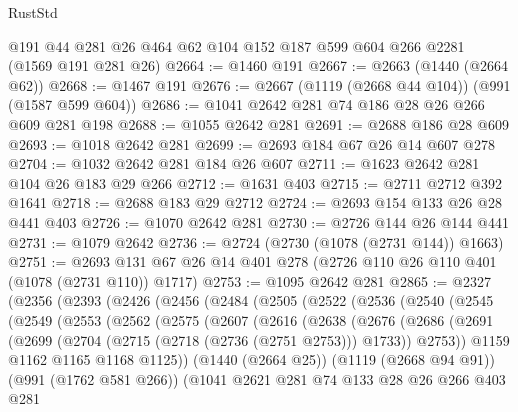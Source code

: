 \begin{lexlean}{RustStd}
\begin{coremodule}
    @191
    @44
    @281
    @26
    @464
    @62
    @104
    @152
    @187
    @599
    @604
    @266
    @2281
    (@1569 @191 @281 @26)
@2664 := @1460 @191
@2667 := @2663 (@1440 (@2664 @62))
@2668 := @1467 @191
@2676 := @2667 (@1119 (@2668 @44 @104)) (@991 (@1587 @599 @604))
@2686 := @1041 @2642 @281 @74 @186 @28 @26 @266 @609 @281 @198
@2688 := @1055 @2642 @281
@2691 := @2688 @186 @28 @609
@2693 := @1018 @2642 @281
@2699 := @2693 @184 @67 @26 @14 @607 @278
@2704 := @1032 @2642 @281 @184 @26 @607
@2711 := @1623 @2642 @281 @104 @26 @183 @29 @266
@2712 := @1631 @403
@2715 := @2711 @2712 @392 @1641
@2718 := @2688 @183 @29 @2712
@2724 := @2693 @154 @133 @26 @28 @441 @403
@2726 := @1070 @2642 @281
@2730 := @2726 @144 @26 @144 @441
@2731 := @1079 @2642
@2736 := @2724 (@2730 (@1078 (@2731 @144)) @1663)
@2751 := @2693 @131 @67 @26 @14 @401 @278 (@2726 @110 @26 @110 @401 (@1078 (@2731 @110)) @1717)
@2753 := @1095 @2642 @281
@2865 := @2327
    (@2356
      (@2393
        (@2426
          (@2456
            (@2484
              (@2505
                (@2522
                  (@2536
                    (@2540
                      (@2545
                        (@2549
                          (@2553
                            (@2562
                              (@2575
                                (@2607
                                  (@2616
                                    (@2638
                                      (@2676
                                        (@2686
                                          (@2691
                                            (@2699
                                              (@2704 (@2715 (@2718 (@2736 (@2751 @2753))) @1733))
                                              @2753))
                                          @1159
                                          @1162
                                          @1165
                                          @1168
                                          @1125))
                                      (@1440 (@2664 @25))
                                      (@1119 (@2668 @94 @91))
                                      (@991 (@1762 @581 @266))
                                      (@1041
                                        @2621
                                        @281
                                        @74
                                        @133
                                        @28
                                        @26
                                        @266
                                        @403
                                        @281

\end{coremodule}
\end{lexlean}

